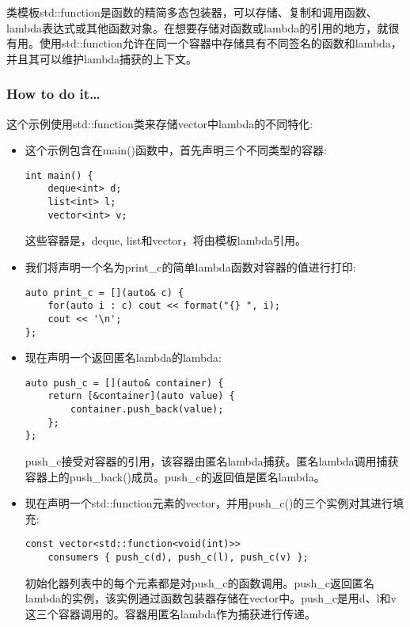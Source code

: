 
类模板std::function是函数的精简多态包装器，可以存储、复制和调用函数、lambda表达式或其他函数对象。在想要存储对函数或lambda的引用的地方，就很有用。使用std::function允许在同一个容器中存储具有不同签名的函数和lambda，并且其可以维护lambda捕获的上下文。

\subsubsection{How to do it…}

这个示例使用std::function类来存储vector中lambda的不同特化:

\begin{itemize}
\item 
这个示例包含在main()函数中，首先声明三个不同类型的容器:

\begin{lstlisting}[style=styleCXX]
int main() {
	deque<int> d;
	list<int> l;
	vector<int> v;
\end{lstlisting}

这些容器是，deque, list和vector，将由模板lambda引用。

\item 
我们将声明一个名为print\_c的简单lambda函数对容器的值进行打印:

\begin{lstlisting}[style=styleCXX]
auto print_c = [](auto& c) {
	for(auto i : c) cout << format("{} ", i);
	cout << '\n';
};
\end{lstlisting}

\item 
现在声明一个返回匿名lambda的lambda:

\begin{lstlisting}[style=styleCXX]
auto push_c = [](auto& container) {
	return [&container](auto value) {
		container.push_back(value);
	};
};
\end{lstlisting}

push\_c接受对容器的引用，该容器由匿名lambda捕获。匿名lambda调用捕获容器上的push\_back()成员。push\_c的返回值是匿名lambda。

\item 
现在声明一个std::function元素的vector，并用push\_c()的三个实例对其进行填充:

\begin{lstlisting}[style=styleCXX]
const vector<std::function<void(int)>>
	consumers { push_c(d), push_c(l), push_c(v) };
\end{lstlisting}

初始化器列表中的每个元素都是对push\_c的函数调用。push\_c返回匿名lambda的实例，该实例通过函数包装器存储在vector中。push\_c是用d、l和v这三个容器调用的。容器用匿名lambda作为捕获进行传递。


\end{itemize}

